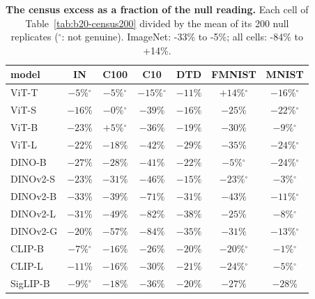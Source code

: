 \begin{table}[H]
\centering
\small
\setlength{\tabcolsep}{4pt}
\begin{tabular}{lcccccc}
\toprule
model & IN & C100 & C10 & DTD & FMNIST & MNIST \\
\midrule
ViT-T & $-5\%$$^{\circ}$ & $-5\%$$^{\circ}$ & $-15\%$$^{\circ}$ & $-11\%$ & $+14\%$$^{\circ}$ & $-16\%$$^{\circ}$ \\
ViT-S & $-16\%$ & $-0\%$$^{\circ}$ & $-39\%$ & $-16\%$ & $-25\%$ & $-22\%$$^{\circ}$ \\
ViT-B & $-23\%$ & $+5\%$$^{\circ}$ & $-36\%$ & $-19\%$ & $-30\%$ & $-9\%$$^{\circ}$ \\
ViT-L & $-22\%$ & $-18\%$ & $-42\%$ & $-29\%$ & $-35\%$ & $-24\%$$^{\circ}$ \\
\midrule
DINO-B & $-27\%$ & $-28\%$ & $-41\%$ & $-22\%$ & $-5\%$$^{\circ}$ & $-24\%$$^{\circ}$ \\
DINOv2-S & $-23\%$ & $-31\%$ & $-46\%$ & $-15\%$ & $-23\%$$^{\circ}$ & $-3\%$$^{\circ}$ \\
DINOv2-B & $-33\%$ & $-39\%$ & $-71\%$ & $-31\%$ & $-43\%$ & $-11\%$$^{\circ}$ \\
DINOv2-L & $-31\%$ & $-49\%$ & $-82\%$ & $-38\%$ & $-25\%$ & $-8\%$$^{\circ}$ \\
DINOv2-G & $-20\%$ & $-57\%$ & $-84\%$ & $-35\%$ & $-31\%$ & $-13\%$$^{\circ}$ \\
\midrule
CLIP-B & $-7\%$$^{\circ}$ & $-16\%$ & $-26\%$ & $-20\%$ & $-20\%$$^{\circ}$ & $-1\%$$^{\circ}$ \\
CLIP-L & $-11\%$ & $-16\%$ & $-30\%$ & $-21\%$ & $-24\%$$^{\circ}$ & $-5\%$$^{\circ}$ \\
SigLIP-B & $-9\%$$^{\circ}$ & $-18\%$ & $-36\%$ & $-20\%$ & $-27\%$ & $-28\%$ \\
\bottomrule
\end{tabular}
\caption{\textbf{The census excess as a fraction of the null reading.} Each cell of Table~\ref{tab:b20-census200} divided by the mean of its 200 null replicates ($^{\circ}$: not genuine). ImageNet: -33\% to -5\%; all cells: -84\% to +14\%. %
}
\label{tab:b40-normalized}
\end{table}
